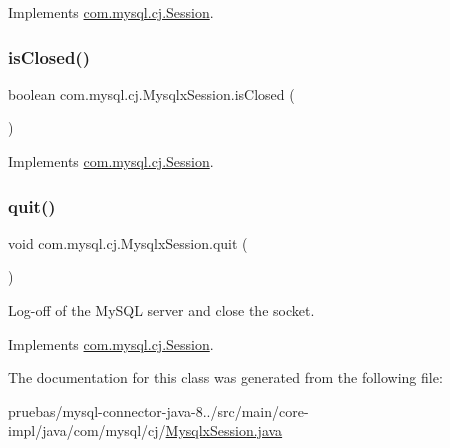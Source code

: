 Implements \mbox{\hyperlink{interfacecom_1_1mysql_1_1cj_1_1_session_a04063248e91bc3aa9dbe8d4db1d0a4c2}{com.\+mysql.\+cj.\+Session}}.

\mbox{\label{classcom_1_1mysql_1_1cj_1_1_mysqlx_session_a1507b9d1e31b712971270eb58a291f3b}} 
\subsubsection{\texorpdfstring{is\+Closed()}{isClosed()}}
{\footnotesize\ttfamily boolean com.\+mysql.\+cj.\+Mysqlx\+Session.\+is\+Closed (\begin{DoxyParamCaption}{ }\end{DoxyParamCaption})}



Implements \mbox{\hyperlink{interfacecom_1_1mysql_1_1cj_1_1_session_a82714d0d3979d474bcafd3884f3ea0de}{com.\+mysql.\+cj.\+Session}}.

\mbox{\label{classcom_1_1mysql_1_1cj_1_1_mysqlx_session_a20bd0339551fe3c5bb9b5806e2036ed3}} 
\subsubsection{\texorpdfstring{quit()}{quit()}}
{\footnotesize\ttfamily void com.\+mysql.\+cj.\+Mysqlx\+Session.\+quit (\begin{DoxyParamCaption}{ }\end{DoxyParamCaption})}

Log-\/off of the My\+S\+QL server and close the socket. 

Implements \mbox{\hyperlink{interfacecom_1_1mysql_1_1cj_1_1_session_af29d73c4e1343fb4bee53b0bac720108}{com.\+mysql.\+cj.\+Session}}.



The documentation for this class was generated from the following file\+:\begin{DoxyCompactItemize}
\item 
pruebas/mysql-\/connector-\/java-\/8../src/main/core-\/impl/java/com/mysql/cj/\mbox{\hyperlink{main_2core-impl_2java_2com_2mysql_2cj_2_mysqlx_session_8java}{Mysqlx\+Session.\+java}}\end{DoxyCompactItemize}
